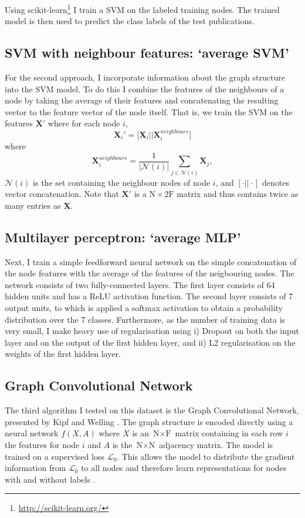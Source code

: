 \documentclass[12pt]{article}
\theoremstyle{definition}
\begin{document}
\bigskip

Using scikit-learn\footnote{\url{http://scikit-learn.org/}} \cite{scikit-learn} I train a SVM on the labeled training nodes. The trained model is then used to predict the class labels of the test publications.

\subsection{SVM with neighbour features: `average SVM'}
\label{section/average_svm}
For the second approach, I incorporate information about the graph structure into the SVM model. To do this I combine the features of the neighbours of a node by taking the average of their features and concatenating the resulting  vector to the feature vector of the node itself. That is, we train the SVM on the features $\mathbf{X}'$ where for each node $i$,
\[
	\mathbf{X}_i' = \big[\mathbf{X}_i \big\vert \big\vert \mathbf{X}^{\mathit{neighbours}}_i \big]
\]
where
\[
	\mathbf{X}^{\mathit{neighbours}}_i  = \frac{1}{\left\vert \mathcal{N}(i) \right\vert} \sum_{j \in \mathcal{N}(i)} \mathbf{X}_j,
\]
$\mathcal{N}(i)$ is the set containing the neighbour nodes of node $i$, and $[\cdot \vert\vert \cdot ]$ denotes vector concatenation. Note that $\mathbf{X}'$ is a $\textrm{N} \times 2 \textrm{F}$ matrix and thus contains twice as many entries as $\mathbf{X}$.

\subsection{Multilayer perceptron: `average MLP'}
Next, I train a simple feedforward neural network on the simple concatenation of the node features with the average of the features of the neigbouring nodes. The network consists of two fully-connected layers. The first layer consists of 64 hidden units and has a ReLU activation function. The second layer consists of 7 output units, to which is applied a softmax activation to obtain a probability distribution over the 7 classes. Furthermore, as the number of training data is very small, I make heavy use of regularisation using i) Dropout \cite{srivastava2014dropout} on both the input layer and on the output of the first hidden layer, and ii) L2 regularisation on the weights of the first hidden layer.

\subsection{Graph Convolutional Network}
The third algorithm I tested on this dataset is the Graph Convolutional Network, presented by Kipf and Welling \cite{kipf2017semi}. The graph structure is encoded directly using a neural network $f(X, A)$ where $X$ is an $\textrm{N} \times \textrm{F}$ matrix containing in each row $i$ the features for node $i$ and $A$ is the $\textrm{N} \times \textrm{N}$ adjacency matrix. The model is trained on a supervised loss $\mathcal{L}_0$. This allows the model to distribute the gradient information from $\mathcal{L}_0$ to all nodes and therefore learn representations for nodes with and without labels \cite{kipf2017semi}.
\end{document}
